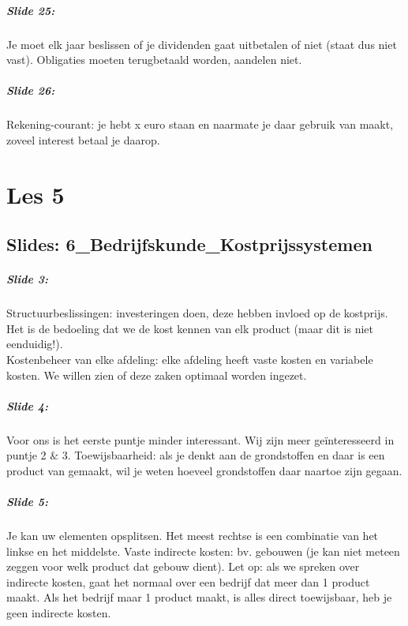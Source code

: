 \documentclass[10pt,a4paper]{report}
\begin{document}
\paragraph{Slide 25:} Je moet elk jaar beslissen of je dividenden gaat uitbetalen of niet (staat dus niet vast). Obligaties moeten terugbetaald worden, aandelen niet.

\paragraph{Slide 26:} Rekening-courant: je hebt x euro staan en naarmate je daar gebruik van maakt, zoveel interest betaal je daarop.

\chapter{Les 5}

\section{Slides: 6\_Bedrijfskunde\_Kostprijssystemen}

\paragraph{Slide 3:} Structuurbeslissingen: investeringen doen, deze hebben invloed op de kostprijs. Het is de bedoeling dat we de kost kennen van elk product (maar dit is niet eenduidig!).\\
Kostenbeheer van elke afdeling: elke afdeling heeft vaste kosten en variabele kosten. We willen zien of deze zaken optimaal worden ingezet.

\paragraph{Slide 4:} Voor ons is het eerste puntje minder interessant. Wij zijn meer ge\"interesseerd in puntje 2 $\&$ 3. Toewijsbaarheid: als je denkt aan de grondstoffen en daar is een product van gemaakt, wil je weten hoeveel grondstoffen daar naartoe zijn gegaan.

\paragraph{Slide 5:} Je kan uw elementen opsplitsen. Het meest rechtse is een combinatie van het linkse en het middelste. Vaste indirecte kosten: bv. gebouwen (je kan niet meteen zeggen voor welk product dat gebouw dient). Let op: als we spreken over indirecte kosten, gaat het normaal over een bedrijf dat meer dan 1 product maakt. Als het bedrijf maar 1 product maakt, is alles direct toewijsbaar, heb je geen indirecte kosten.
\end{document}
